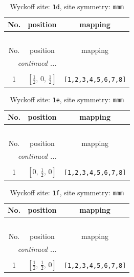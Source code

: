 \documentclass[fleqn,8pt]{jsarticle}
\begin{document}
\renewcommand{\arraystretch}{1.2}
\begin{longtable}{ccc}
\caption{Wyckoff site: {\tt 1d}, site symmetry: {\tt mmm}}
 \\
 \hline \hline
No. & position & mapping \\ \hline \endfirsthead

\multicolumn{2}{l}{\tablename\ \thetable{}} \\
 \hline \hline
No. & position & mapping \\ \hline \endhead

 \hline \hline
\multicolumn{2}{r}{\footnotesize\it continued ...} \\ \endfoot

 \hline \hline
\multicolumn{2}{r}{} \\ \endlastfoot

1 & $\left[ \frac{1}{2},\, 0,\, \frac{1}{2} \right]$ & {\tt [1,2,3,4,5,6,7,8]} \\
\end{longtable}
\renewcommand{\arraystretch}{1.2}
\begin{longtable}{ccc}
\caption{Wyckoff site: {\tt 1e}, site symmetry: {\tt mmm}}
 \\
 \hline \hline
No. & position & mapping \\ \hline \endfirsthead

\multicolumn{2}{l}{\tablename\ \thetable{}} \\
 \hline \hline
No. & position & mapping \\ \hline \endhead

 \hline \hline
\multicolumn{2}{r}{\footnotesize\it continued ...} \\ \endfoot

 \hline \hline
\multicolumn{2}{r}{} \\ \endlastfoot

1 & $\left[ 0,\, \frac{1}{2},\, 0 \right]$ & {\tt [1,2,3,4,5,6,7,8]} \\
\end{longtable}
\renewcommand{\arraystretch}{1.2}
\begin{longtable}{ccc}
\caption{Wyckoff site: {\tt 1f}, site symmetry: {\tt mmm}}
 \\
 \hline \hline
No. & position & mapping \\ \hline \endfirsthead

\multicolumn{2}{l}{\tablename\ \thetable{}} \\
 \hline \hline
No. & position & mapping \\ \hline \endhead

 \hline \hline
\multicolumn{2}{r}{\footnotesize\it continued ...} \\ \endfoot

 \hline \hline
\multicolumn{2}{r}{} \\ \endlastfoot

1 & $\left[ \frac{1}{2},\, \frac{1}{2},\, 0 \right]$ & {\tt [1,2,3,4,5,6,7,8]} \\
\end{longtable}
\end{document}

